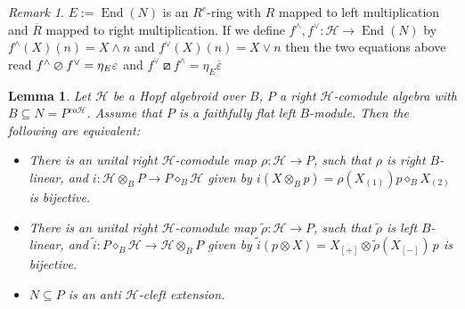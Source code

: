 \documentclass[a4paper,reqno]{amsart}
\DeclareMathOperator{\End}{End}
\numberwithin{equation}{section}
\theoremstyle{plain}
\newtheorem{lem}[thm]{Lemma}
\theoremstyle{remark}
\newtheorem{rem}[thm]{Remark}
\numberwithin{equation}{section}
\newcommand{\ot}{\otimes}
\newcommand\ol{\overline}
\newcommand{\ti}{{\tilde{i}}}
\newcommand{\trho}{{\tilde{\rho}}}
\renewcommand{\o}{{}_{\scriptscriptstyle{(1)}}}
\renewcommand{\t}{{}_{\scriptscriptstyle{(2)}}}
\newcommand{\di}{{\diamond_{B}}}
\newcommand{\CH}{\mathcal{H}}
\newcommand\skpr{\varoslash}
\newcommand\askpr{\boxslash}
\begin{document}
\begin{rem}
    $E:=\End(N)$ is an $R^e$-ring with $R$ mapped to left multiplication and $\ol R$ mapped to right multiplication. If we define $f^\wedge,f^\vee\colon\CH\to \End(N)$ by $f^\wedge(X)(n)=X\wedge n$ and $f^\vee(X)(n)=X\vee n$ then the two equations above read $f^\wedge\skpr f^\vee=\eta_E\varepsilon$ and $f^\vee\askpr f^\wedge=\eta_E\ol \varepsilon$ 
\end{rem}
\begin{lem}\label{def. anti cleft extension}
    Let $\CH$ be a Hopf algebroid over $B$, $P$ a right $\CH$-comodule algebra with $B\subseteq   N=P{}^{co\CH}$. Assume that  $P$ is a faithfully flat left $B$-module. Then the following are equivalent:
    \begin{itemize}
        \item [(1)] There is an unital right $\CH$-comodule map $\rho:  \CH\to P$, such that $\rho$ is  right $B$-linear, and  $i: \CH\ot_{B}P\to P\diamond_{B}\CH$ given by $i(X\ot_{B} p)= \rho(X\o)p\di X\t$ is bijective.
 \item[(2)]  There is an unital right $\CH$-comodule map $\trho:  \CH\to P$, such that $\trho$ is left $B$-linear, and  $\ti: P\diamond_{B}\CH\to\CH\ot_{B}P$ given by $\ti(p\ot X)= X_{[+]}\ot \trho(X_{[-]})\,p$ is bijective.
 \item[(3)] $N\subseteq P$ is an anti $\CH$-cleft extension.
    \end{itemize}
\end{lem}
\end{document}
